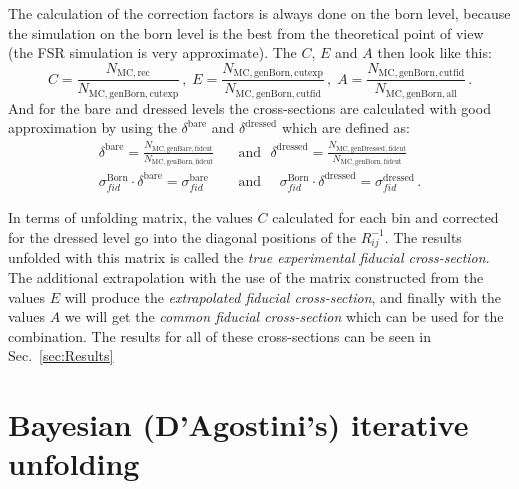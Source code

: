 The calculation of the correction factors is always done on the born level, because the simulation on the born level is the best from the theoretical point of view (the FSR simulation is very approximate). The $C$, $E$ and $A$ then look like this:
\begin{equation}
C = \frac{N_\mathrm{MC, rec}}{N_\mathrm{MC, genBorn, cutexp}}\,, \;
E = \frac{N_\mathrm{MC, genBorn, cutexp}}{N_\mathrm{MC, genBorn, cutfid}}\,, \;
A = \frac{N_\mathrm{MC, genBorn, cutfid}}{N_\mathrm{MC, genBorn, all}}\,.
\end{equation}
And for the bare and dressed levels the cross-sections are calculated with good approximation by using the $\delta^\mathrm{bare}$ and $\delta^\mathrm{dressed}$ which are defined as:
\begin{equation}
\begin{split}
  \delta^\mathrm{bare} = \frac{N_\mathrm{MC, genBare, fidcut}}{N_\mathrm{MC, genBorn, fidcut}}\:\:\:&\mbox{and}\:\:\:
  \delta^\mathrm{dressed} = \frac{N_\mathrm{MC, genDressed, fidcut}}{N_\mathrm{MC, genBorn, fidcut}}\\
  \sigma_{fid}^\mathrm{Born} \cdot \delta^\mathrm{bare} =
  \sigma_{fid}^\mathrm{bare} \:\:\:\:\:\:&\mbox{and}\:\:\:\:\:\:
  \sigma_{fid}^\mathrm{Born} \cdot \delta^\mathrm{dressed} =
  \sigma_{fid}^\mathrm{dressed} \,.
\end{split}
\end{equation}

In terms of unfolding matrix, the values $C$ calculated for each bin and corrected for the dressed level go into the diagonal positions of the $R^{-1}_{ij}$. The results unfolded with this matrix is called the {\itshape true experimental fiducial cross-section}. The additional extrapolation with the use of the matrix constructed from the values $E$ will produce the {\itshape extrapolated fiducial cross-section}, and finally with the values $A$ we will get the {\itshape common fiducial cross-section} which can be used for the combination. The results for all of these cross-sections can be seen in Sec.~\ref{sec:Results}

\section{Bayesian (D'Agostini's) iterative unfolding}

